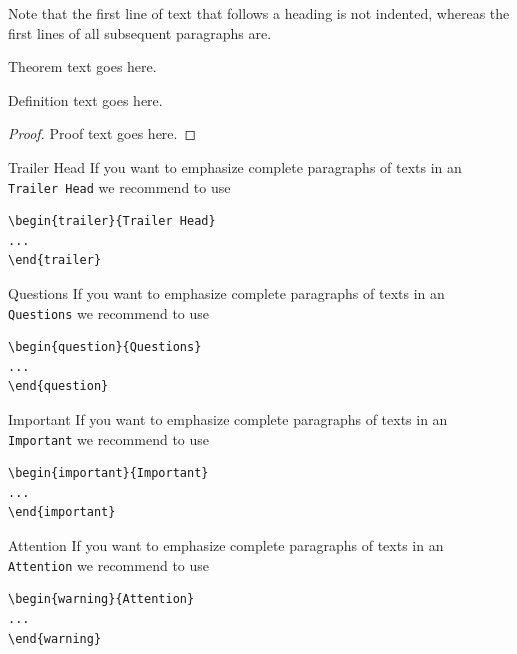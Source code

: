 Note that the first line of text that follows a heading is not indented, whereas the first lines of all subsequent paragraphs are.
%
%
\begin{theorem}
Theorem text goes here.
\end{theorem}
%
\begin{definition}
Definition text goes here.
\end{definition}
%
\begin{proof}
Proof text goes here.
\end{proof}
%
%
\begin{trailer}{Trailer Head}
If you want to emphasize complete paragraphs of texts in an \verb|Trailer Head| we recommend to
use  \begin{verbatim}\begin{trailer}{Trailer Head}
...
\end{trailer}\end{verbatim}
\end{trailer}
%
\begin{question}{Questions}
If you want to emphasize complete paragraphs of texts in an \verb|Questions| we recommend to
use  \begin{verbatim}\begin{question}{Questions}
...
\end{question}\end{verbatim}
\end{question}
%
%
\begin{important}{Important}
If you want to emphasize complete paragraphs of texts in an \verb|Important| we recommend to
use  \begin{verbatim}\begin{important}{Important}
...
\end{important}\end{verbatim}
\end{important}
%
\clearpage
\begin{warning}{Attention}
If you want to emphasize complete paragraphs of texts in an \verb|Attention| we recommend to
use  \begin{verbatim}\begin{warning}{Attention}
...
\end{warning}\end{verbatim}
\end{warning}

